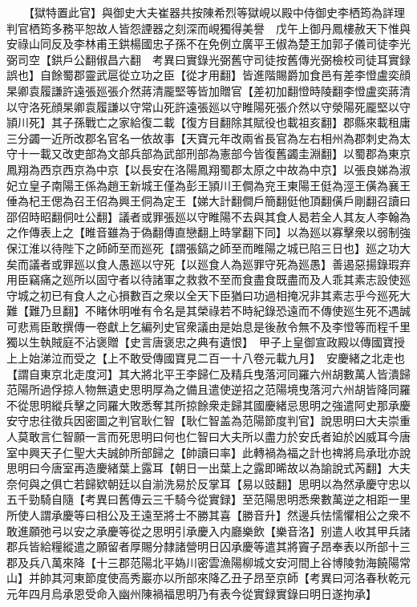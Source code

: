 　　【獄特置此官】與御史大夫崔器共按陳希烈等獄峴以殿中侍御史李栖筠為詳理判官栖筠多務平恕故人皆怨諲器之刻深而峴獨得美譽　戊午上御丹鳳樓赦天下惟與安祿山同反及李林甫王鉷楊國忠子孫不在免例立廣平王俶為楚王加郭子儀司徒李光弼司空【鉷戶公翻俶昌六翻　考異曰實錄光弼舊守司徒按舊傳光弼檢校司徒耳實録誤也】自餘蜀郡靈武扈從立功之臣【從才用翻】皆進階賜爵加食邑有差李憕盧奕顔杲卿袁履謙許遠張廵張介然蔣清龎堅等皆加贈官【差初加翻憕時陵翻李憕盧奕蔣清以守洛死顔杲卿袁履謙以守常山死許遠張廵以守睢陽死張介然以守滎陽死龎堅以守頴川死】其子孫戰亡之家給復二載【復方目翻除其賦役也載祖亥翻】郡縣來載租庸三分蠲一近所改郡名官名一依故事【天寶元年改兩省長官為左右相州為郡刺史為太守十一載又改吏部為文部兵部為武部刑部為憲部今皆復舊蠲圭淵翻】以蜀郡為東京鳳翔為西京西京為中京【以長安在洛陽鳳翔蜀郡太原之中故為中京】以張良娣為淑妃立皇子南陽王係為趙王新城王僅為彭王頴川王僴為兖王東陽王侹為涇王僙為襄王倕為杞王偲為召王佋為興王侗為定王【娣大計翻僴戶簡翻侹他頂翻僙戶剛翻召讀曰邵佋時昭翻侗吐公翻】議者或罪張廵以守睢陽不去與其食人曷若全人其友人李翰為之作傳表上之【睢音雖為于偽翻傳直戀翻上時掌翻下同】以為廵以寡擊衆以弱制強保江淮以待陛下之師師至而廵死【謂張鎬之師至而睢陽之城已陷三日也】廵之功大矣而議者或罪廵以食人愚廵以守死【以廵食人為廵罪守死為廵愚】善遏惡揚錄瑕弃用臣竊痛之廵所以固守者以待諸軍之救救不至而食盡食既盡而及人乖其素志設使廵守城之初已有食人之心損數百之衆以全天下臣猶曰功過相掩况非其素志乎今廵死大難【難乃旦翻】不睹休明唯有令名是其榮祿若不時紀錄恐遠而不傳使廵生死不遇誠可悲焉臣敢撰傳一卷獻上乞編列史官衆議由是始息是後赦令無不及李憕等而程千里獨以生執賊庭不沾褒贈【史言唐褒忠之典有遺恨】　甲子上皇御宣政殿以傳國寶授上上始涕泣而受之【上不敢受傳國寶見二百一十八卷元載九月】　安慶緒之北走也【謂自東京北走度河】其大將北平王李歸仁及精兵曳落河同羅六州胡數萬人皆潰歸范陽所過俘掠人物無遺史思明厚為之備且遣使逆招之范陽境曳落河六州胡皆降同羅不從思明縱兵擊之同羅大敗悉奪其所掠餘衆走歸其國慶緒忌思明之強遣阿史那承慶安守忠往徵兵因密圖之判官耿仁智【耿仁智盖為范陽節度判官】說思明曰大夫崇重人莫敢言仁智願一言而死思明曰何也仁智曰大夫所以盡力於安氏者廹於凶威耳今唐室中興天子仁聖大夫誠帥所部歸之【帥讀曰率】此轉禍為福之計也禆將烏承玭亦說思明曰今唐室再造慶緒葉上露耳【朝日一出葉上之露即晞故以為諭說式芮翻】大夫奈何與之俱亡若歸欵朝廷以自湔洗易於反掌耳【易以豉翻】思明以為然承慶守忠以五千勁騎自隨【考異曰舊傳云三千騎今從實録】至范陽思明悉衆數萬逆之相距一里所使人謂承慶等曰相公及王遠至將士不勝其喜【勝音升】然邊兵怯懦懼相公之衆不敢進願弛弓以安之承慶等從之思明引承慶入内廳樂飲【樂音洛】别遣人收其甲兵諸郡兵皆給糧縱遣之願留者厚賜分隸諸營明日囚承慶等遣其將竇子昂奉表以所部十三郡及兵八萬來降【十三郡范陽北平媯川密雲漁陽柳城文安河間上谷博陵勃海饒陽常山】并帥其河東節度使高秀巖亦以所部來降乙丑子昂至京師【考異曰河洛春秋乾元元年四月烏承恩受命入幽州陳禍福思明乃有表今從實録實錄曰明日遂拘承】

